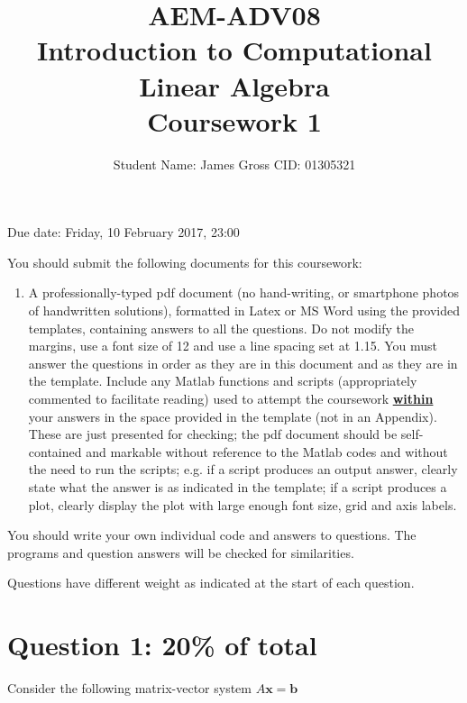 \documentclass[12pt]{article}
\def\MM#1{\boldsymbol{#1}}
\begin{document}
\title{\textbf{\Large{AEM-ADV08}\\ \Large{Introduction to Computational Linear Algebra}\\Coursework 1}}

\author{Student Name: James Gross \hspace{1 cm} CID: 01305321    }
\date{}
\maketitle
Due date: Friday, 10 February 2017, 23:00

You should submit the following documents for this coursework:
\begin{enumerate}
\item A professionally-typed pdf document (no hand-writing, or smartphone photos of handwritten solutions), formatted in Latex or MS Word using the provided templates, containing answers to all the questions. Do not modify the margins, use a font size of 12 and use a line spacing set at 1.15. You must answer the questions in order as they are in this document and as they are in the template. Include any Matlab functions and scripts (appropriately commented to facilitate reading) used to attempt the coursework \underline{\textbf{within}} your answers in the space provided in the template (not in an Appendix). These are just presented for checking; the pdf document should be self-contained and markable without reference to the Matlab codes and without the need to run the scripts; e.g. if a script produces an output answer, clearly state what the answer is as indicated in the template; if a script produces a plot, clearly display the plot with large enough font size, grid and axis labels.
\end{enumerate}
You should write your own individual code and answers to questions. The programs and question answers will be checked for similarities.

Questions have different weight as indicated at the start of each question. 


\newpage

\section*{Question 1: 20\% of total}
Consider the following matrix-vector system $A\MM{x}=\MM{b}$
\end{document}

